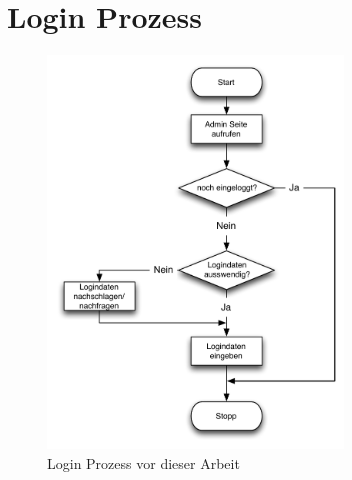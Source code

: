 \section{Login Prozess}
\label{sec:Login Prozess}

\begin{figure}[H]  
		\includegraphics[width=0.70\textwidth]{include/login_before.pdf}
		\caption{Login Prozess vor dieser Arbeit}
		\label{fig:login-before}
\end{figure}
